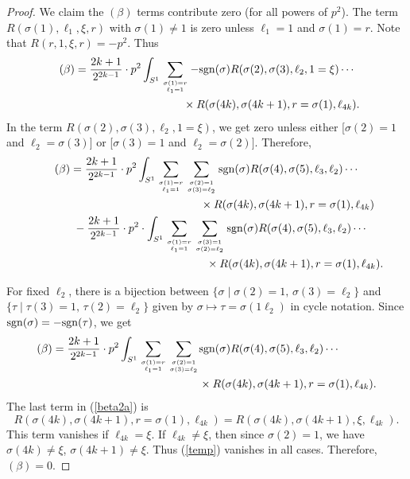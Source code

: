 \documentclass[pdftex]{sigma}
\numberwithin{equation}{section}
\theoremstyle{definition}
\newcommand{\bxi}{\xi}
\newcommand{\br}{ R}
\newcommand{\sgn}{{\rm sgn}}
\newcommand{\ints}{\int_{S^1}}
\begin{document}
\begin{proof}
We claim the $(\beta)$ terms contribute zero \big(for all powers of $p^2$\big). The term
$ \br(\sigma(1), \ell_1,\bxi,r)$ with $\sigma(1)\neq 1$ is zero unless $\ell_1 = 1$ and $\sigma(1) = r$. Note that $\br(r, 1, \bxi, r) = -p^2$. Thus
\begin{gather*}
(\beta)=\frac{2k+1}{2^{2k-1}}\cdot p^2\ints \sum_{\sigma(1) = r\atop \ell_1 = 1} -\sgn(\sigma)
\br(\sigma(2), \sigma(3), \ell_2, 1 = \bxi)\cdots\\
\hphantom{(\beta)=\frac{2k+1}{2^{2k-1}}\cdot p^2\ints \sum_{\sigma(1) = r\atop \ell_1 = 1} }{} \times
 \br(\sigma(4k),\sigma(4k+1), r = \sigma(1), \ell_{4k}).\nonumber
 \end{gather*}
In the term $\br(\sigma(2), \sigma(3), \ell_2, 1 = \bxi)$, we
get zero unless either [$\sigma(2) = 1$ and $\ell_2 = \sigma(3)$] or [$\sigma(3) = 1$
and $\ell_2 = \sigma(2)]$. Therefore,
\begin{gather*}
(\beta)
=\frac{2k+1}{2^{2k-1}}\cdot p^2
\ints \sum_{\sigma(1) = r\atop \ell_1 = 1}\sum_{\sigma(2) = 1\atop \sigma(3) = \ell_2}\sgn(\sigma)
\br(\sigma(4), \sigma(5), \ell_3, \ell_2)\cdots \\
\hphantom{(\beta)=\frac{2k+1}{2^{2k-1}}\cdot p^2
\ints \sum_{\sigma(1) = r\atop \ell_1 = 1}\sum_{\sigma(2) = 1\atop \sigma(3) = \ell_2}}{}
\times
 \br(\sigma(4k),\sigma(4k+1), r = \sigma(1), \ell_{4k})\\
\hphantom{(\beta)=}{} - \frac{2k+1}{2^{2k-1}}\cdot p^2
\cdot \ints\sum_{\sigma(1) = r\atop \ell_1 = 1}\sum_{\sigma(3) = 1\atop \sigma(2) = \ell_2}\sgn(\sigma)
\br(\sigma(4), \sigma(5), \ell_3, \ell_2)\cdots\\
\hphantom{(\beta)=- \frac{2k+1}{2^{2k-1}}\cdot p^2\cdot \ints\sum_{\sigma(1) = r\atop \ell_1 = 1}\sum_{\sigma(3) = 1\atop \sigma(2) = \ell_2}}{}
\times
 \br(\sigma(4k),\sigma(4k+1), r = \sigma(1), \ell_{4k}).
 \end{gather*}

For fixed $\ell_2$, there is a bijection between $\{\sigma \mid \sigma(2) = 1,\, \sigma(3) = \ell_2\}$
and
$\{\tau\mid \tau(3) = 1,\, \tau(2) = \ell_2\}$ given by $\sigma\mapsto \tau =\sigma(1\ell_2)$ in cycle notation. Since $\sgn(\sigma) = -\sgn(\tau)$, we get
\begin{align}\nonumber
(\beta)
=\frac{2k+1}{2^{2k-1}}\cdot p^2
\ints \sum_{\sigma(1) = r\atop \ell_1 = 1}\sum_{\sigma(2) = 1\atop \sigma(3) = \ell_2}&\sgn(\sigma)
\br(\sigma(4), \sigma(5), \ell_3, \ell_2)\cdots\\
&\times
 \br(\sigma(4k),\sigma(4k+1), r = \sigma(1), \ell_{4k}).\label{beta2a}
 \end{align}
The last term in (\ref{beta2a}) is
\begin{equation}\label{temp}\br(\sigma(4k),\sigma(4k+1), r = \sigma(1), \ell_{4k}) =
\br(\sigma(4k),\sigma(4k+1), \bxi, \ell_{4k}).
\end{equation}
This term vanishes if $\ell_{4k} = \bxi$. If $\ell_{4k}\neq \bxi$, then since $\sigma(2) = 1$, we have $\sigma(4k)\neq \bxi$, ${\sigma(4k+1)\neq \bxi}$. Thus (\ref{temp}) vanishes in all cases.
Therefore, $(\beta) = 0$.


\end{proof}
\end{document}
